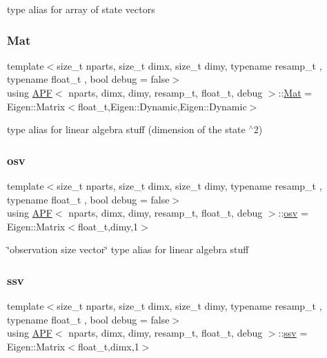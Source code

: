 type alias for array of state vectors \mbox{\label{classAPF_ac241705f732b7e0a0bc1a3bc518a92d2}} 
\subsubsection{\texorpdfstring{Mat}{Mat}}
{\footnotesize\ttfamily template$<$size\+\_\+t nparts, size\+\_\+t dimx, size\+\_\+t dimy, typename resamp\+\_\+t , typename float\+\_\+t , bool debug = false$>$ \\
using \hyperlink{classAPF}{A\+PF}$<$ nparts, dimx, dimy, resamp\+\_\+t, float\+\_\+t, debug $>$\+::\hyperlink{classAPF_ac241705f732b7e0a0bc1a3bc518a92d2}{Mat} =  Eigen\+::\+Matrix$<$float\+\_\+t,Eigen\+::\+Dynamic,Eigen\+::\+Dynamic$>$}

type alias for linear algebra stuff (dimension of the state $^\wedge$2) \mbox{\label{classAPF_ae4887b3f7121a7509397dd00bffedfe0}} 
\subsubsection{\texorpdfstring{osv}{osv}}
{\footnotesize\ttfamily template$<$size\+\_\+t nparts, size\+\_\+t dimx, size\+\_\+t dimy, typename resamp\+\_\+t , typename float\+\_\+t , bool debug = false$>$ \\
using \hyperlink{classAPF}{A\+PF}$<$ nparts, dimx, dimy, resamp\+\_\+t, float\+\_\+t, debug $>$\+::\hyperlink{classAPF_ae4887b3f7121a7509397dd00bffedfe0}{osv} =  Eigen\+::\+Matrix$<$float\+\_\+t,dimy,1$>$}

\char`\"{}observation size vector\char`\"{} type alias for linear algebra stuff \mbox{\label{classAPF_a8b170471292cd6fb5c3c19b55b42fc4e}} 
\subsubsection{\texorpdfstring{ssv}{ssv}}
{\footnotesize\ttfamily template$<$size\+\_\+t nparts, size\+\_\+t dimx, size\+\_\+t dimy, typename resamp\+\_\+t , typename float\+\_\+t , bool debug = false$>$ \\
using \hyperlink{classAPF}{A\+PF}$<$ nparts, dimx, dimy, resamp\+\_\+t, float\+\_\+t, debug $>$\+::\hyperlink{classAPF_a8b170471292cd6fb5c3c19b55b42fc4e}{ssv} =  Eigen\+::\+Matrix$<$float\+\_\+t,dimx,1$>$}

